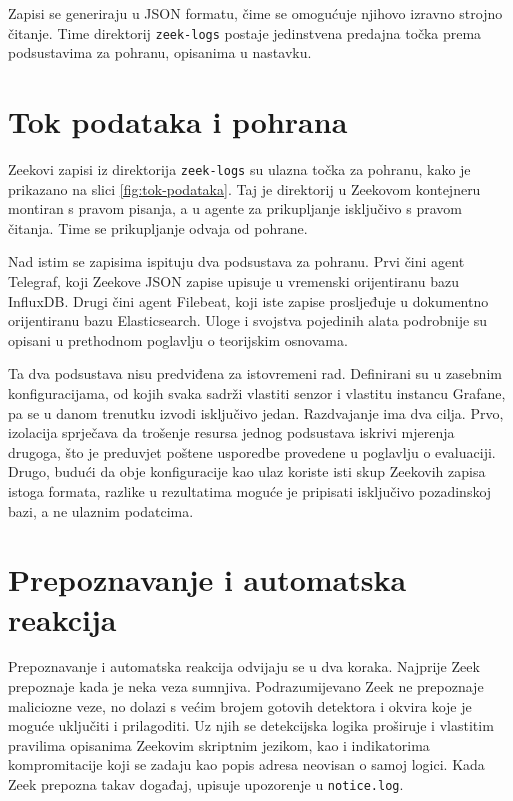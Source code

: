 Zapisi se generiraju u JSON formatu, čime se omogućuje njihovo izravno strojno čitanje. Time direktorij \texttt{zeek-logs} postaje
jedinstvena predajna točka prema podsustavima za pohranu, opisanima u nastavku.


\section{Tok podataka i pohrana}
Zeekovi zapisi iz direktorija \texttt{zeek-logs} su ulazna točka za pohranu, kako je prikazano na slici \ref{fig:tok-podataka}. Taj je direktorij u Zeekovom
kontejneru montiran s pravom pisanja, a u agente za prikupljanje isključivo s pravom čitanja. Time se prikupljanje odvaja od pohrane.

Nad istim se zapisima ispituju dva podsustava za pohranu. Prvi čini agent Telegraf, koji Zeekove JSON zapise upisuje u vremenski orijentiranu bazu
InfluxDB. Drugi čini agent Filebeat, koji iste zapise prosljeđuje u dokumentno orijentiranu bazu Elasticsearch. Uloge i svojstva pojedinih alata podrobnije su
opisani u prethodnom poglavlju o teorijskim osnovama.

Ta dva podsustava nisu predviđena za istovremeni rad. Definirani su u zasebnim konfiguracijama, od kojih svaka sadrži vlastiti senzor i vlastitu instancu Grafane, 
pa se u danom trenutku izvodi isključivo jedan. Razdvajanje ima dva cilja. Prvo, izolacija sprječava da trošenje resursa jednog podsustava iskrivi mjerenja drugoga, 
što je preduvjet poštene usporedbe provedene u poglavlju o evaluaciji. Drugo, budući da obje konfiguracije kao ulaz koriste isti skup Zeekovih zapisa istoga formata, 
razlike u rezultatima moguće je pripisati isključivo pozadinskoj bazi, a ne ulaznim podatcima.

\section{Prepoznavanje i automatska reakcija}
Prepoznavanje i automatska reakcija odvijaju se u dva koraka. Najprije Zeek prepoznaje kada je neka veza sumnjiva. Podrazumijevano Zeek ne prepoznaje maliciozne veze, 
no dolazi s većim brojem gotovih detektora i okvira koje je moguće uključiti i prilagoditi. Uz njih se detekcijska logika proširuje i vlastitim pravilima opisanima 
Zeekovim skriptnim jezikom, kao i indikatorima kompromitacije  koji se zadaju kao popis adresa neovisan o samoj logici. Kada Zeek 
prepozna takav događaj, upisuje upozorenje u \texttt{notice.log}.

